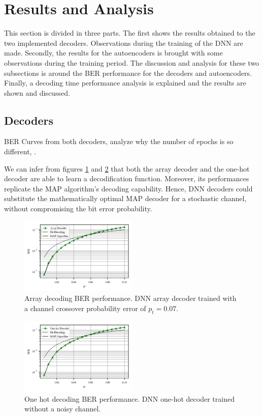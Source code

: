 \documentclass[conference]{IEEEtran}
\begin{document}
\section{Results and Analysis}

This section is divided in three parts. The first shows the results obtained to the two implemented decoders. Observations during the training of the DNN are made. Secondly, the results for the autoencoders is brought with some observations during the training period. The discussion and analysis for these two subsections is around the BER performance for the decoders and autoencoders. Finally, a decoding time performance analysis is explained and the results are shown and discussed.

\subsection{Decoders}
BER Curves from both decoders, analyze why the number of epochs is so different, .

We can infer from figures \ref{fig:ArrayD} and \ref{fig:1HD} that both the array decoder and the one-hot decoder are able to learn a decodification function. Moreover,  its performances replicate the MAP algorithm's decoding capability. Hence, DNN decoders could substitute the mathematically optimal MAP decoder for a stochastic channel, without compromising the bit error probability.

\begin{figure}[!ht]
  \centering
    \includegraphics[width=0.5\textwidth]{images/MLNN_Mep_65536_ptrain_007}
    \caption{Array decoding BER performance. DNN array decoder trained with a channel crossover probability error of $p_t=0.07$.}\label{fig:ArrayD}
\end{figure}

\begin{figure}[!ht]
  \centering
    \includegraphics[width=0.5\textwidth]{images/MLNN1H_Mep_16384_ptrain_0}
    \caption{One hot decoding BER performance. DNN one-hot decoder trained without a noisy channel.}\label{fig:1HD}
\end{figure}
\end{document}
